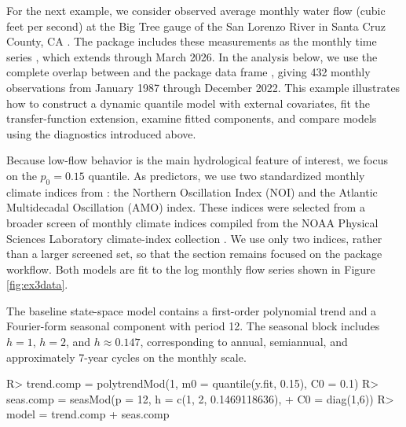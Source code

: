 \documentclass[jss]{jss}
\begin{document}
For the next example, we consider observed average monthly water flow (cubic feet per second) at the Big Tree gauge of the San Lorenzo River in Santa Cruz County, CA \citep{btflow}. The  package includes these measurements as the monthly time series , which extends through March 2026. In the analysis below, we use the complete overlap between  and the package data frame , giving 432 monthly observations from January 1987 through December 2022. This example illustrates how to construct a dynamic quantile model with external covariates, fit the transfer-function extension, examine fitted components, and compare models using the diagnostics introduced above.

Because low-flow behavior is the main hydrological feature of interest, we focus on the \(p_0=0.15\) quantile. As predictors, we use two standardized monthly climate indices from : the Northern Oscillation Index (NOI) and the Atlantic Multidecadal Oscillation (AMO) index. These indices were selected from a broader screen of monthly climate indices compiled from the NOAA Physical Sciences Laboratory climate-index collection \citep{noaaClimateIndices}. We use only two indices, rather than a larger screened set, so that the section remains focused on the package workflow. Both models are fit to the log monthly flow series shown in Figure \ref{fig:ex3data}.

\begin{CodeChunk}
\end{CodeChunk}

The baseline state-space model contains a first-order polynomial trend and a Fourier-form seasonal component with period 12. The seasonal block includes \(h = 1\), \(h = 2\), and \(h \approx 0.147\), corresponding to annual, semiannual, and approximately 7-year cycles on the monthly scale.
\begin{CodeChunk}
\begin{CodeInput}
R> trend.comp = polytrendMod(1, m0 = quantile(y.fit, 0.15), C0 = 0.1)
R> seas.comp = seasMod(p = 12, h = c(1, 2, 0.1469118636),
+                     C0 = diag(1,6))
R> model = trend.comp + seas.comp
\end{CodeInput}
\end{CodeChunk}
\end{document}
